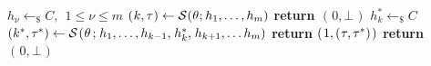 \documentclass{iacrtrans}
\begin{document}
\begin{minipage}{0.96\textwidth}
\vspace{-5pt}
\begin{algorithm}[H]
	\caption{$\textsf{LocalFork}_{\mathcal{S}}(\hspace{0.5pt}\theta\hspace{0.5pt})$}\label{alg_local_fork}
  \begin{algorithmic}[1]
  	\vspace{2pt}
			\State
				$h_\nu \leftarrow_\$ C,
				\ \ 1 \le \nu\le m$
				\vspace{4pt}
			\State
				$(
					\hspace{0.5pt}
					k,
					\tau
					\hspace{0.2pt}
				)
				\leftarrow
				\mathcal{S}
				\hspace{0.3pt}
				(
					\hspace{0.3pt}
					\theta
					\hspace{0.3pt};
					\hspace{0.3pt} h_1,
					\dots,
					h_m
				)$
				\vspace{4pt}
			\vspace{2pt}
    			\State
    				\textbf{return
    					$(
    						\hspace{1pt}
    						0,
    						\bot
    						\hspace{1pt}
    					)
    					$
    				}\vspace{0pt}
			\EndIf
			\State
				$h_k^* \leftarrow_\$ C$
				\vspace{6pt}
			\State
				$(k^*, \tau^*) \leftarrow
				\mathcal{S}
					\hspace{1pt}
					(
						\hspace{0.5pt}
						\theta
						\hspace{1.5pt}
					;
					\hspace{1pt}h_1,
					\dots,
					h_{k-1},
					\hspace{1pt}h_k^*,
					\hspace{1pt} h_{k+1},
					\dots
					h_m
				)$
				\vspace{6pt}
			\vspace{3pt}
				\State
					\textbf{return
						$(
							\hspace{1pt}
							1,
							(
								\hspace{0.5pt}
								\tau,
								\tau^*
							)
							\hspace{1pt})
						$}
					\vspace{2pt}
			\EndIf
			\State
				\textbf{return
					$(
						\hspace{1pt}
						0,
						\bot
						\hspace{1pt}
					)$
				}
  \end{algorithmic}
\end{algorithm}
\vspace{0pt}
\end{minipage}



\end{document}
